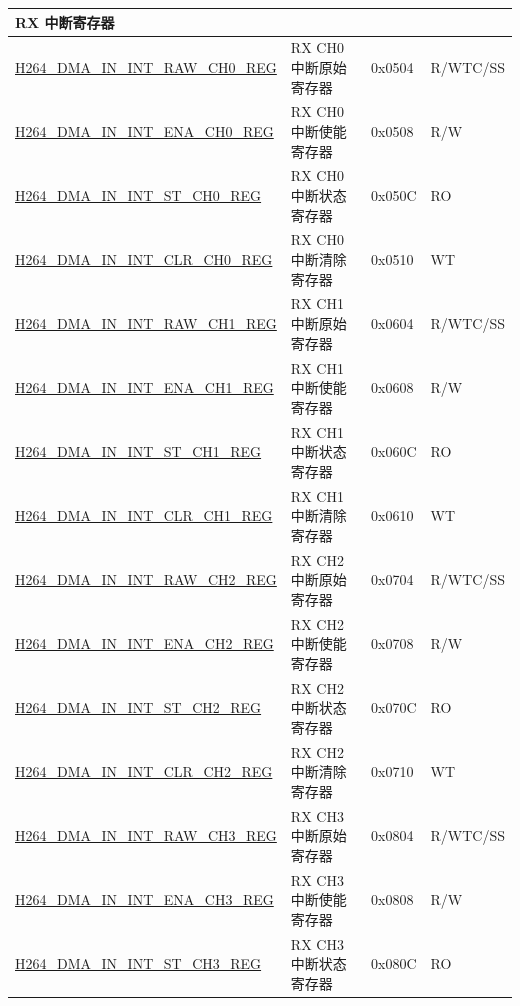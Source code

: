 \begin{longtable}{ | p{7.5cm} | p{5.7cm} | p{1.2cm} | p{1cm} | }
\multicolumn{4}{|l|}{\textbf{RX 中断寄存器}} \\ \hline
    \hyperref[regdesc:H264DMAININTRAWCH0REG]{H264\_DMA\_IN\_INT\_RAW\_CH0\_REG} & RX CH0 中断原始寄存器 & 0x0504 & R/WTC/SS \\ \hline
    \hyperref[regdesc:H264DMAININTENACH0REG]{H264\_DMA\_IN\_INT\_ENA\_CH0\_REG} & RX CH0 中断使能寄存器 & 0x0508 & R/W \\ \hline
    \hyperref[regdesc:H264DMAININTSTCH0REG]{H264\_DMA\_IN\_INT\_ST\_CH0\_REG} & RX CH0 中断状态寄存器 & 0x050C & RO \\ \hline
    \hyperref[regdesc:H264DMAININTCLRCH0REG]{H264\_DMA\_IN\_INT\_CLR\_CH0\_REG} & RX CH0 中断清除寄存器 & 0x0510 & WT \\ \hline
    \hyperref[regdesc:H264DMAININTRAWCH1REG]{H264\_DMA\_IN\_INT\_RAW\_CH1\_REG} & RX CH1 中断原始寄存器 & 0x0604 & R/WTC/SS \\ \hline
    \hyperref[regdesc:H264DMAININTENACH1REG]{H264\_DMA\_IN\_INT\_ENA\_CH1\_REG} & RX CH1 中断使能寄存器 & 0x0608 & R/W \\ \hline
    \hyperref[regdesc:H264DMAININTSTCH1REG]{H264\_DMA\_IN\_INT\_ST\_CH1\_REG} & RX CH1 中断状态寄存器 & 0x060C & RO \\ \hline
    \hyperref[regdesc:H264DMAININTCLRCH1REG]{H264\_DMA\_IN\_INT\_CLR\_CH1\_REG} & RX CH1 中断清除寄存器 & 0x0610 & WT \\ \hline
    \hyperref[regdesc:H264DMAININTRAWCH2REG]{H264\_DMA\_IN\_INT\_RAW\_CH2\_REG} & RX CH2 中断原始寄存器 & 0x0704 & R/WTC/SS \\ \hline
    \hyperref[regdesc:H264DMAININTENACH2REG]{H264\_DMA\_IN\_INT\_ENA\_CH2\_REG} & RX CH2 中断使能寄存器 & 0x0708 & R/W \\ \hline
    \hyperref[regdesc:H264DMAININTSTCH2REG]{H264\_DMA\_IN\_INT\_ST\_CH2\_REG} & RX CH2 中断状态寄存器 & 0x070C & RO \\ \hline
    \hyperref[regdesc:H264DMAININTCLRCH2REG]{H264\_DMA\_IN\_INT\_CLR\_CH2\_REG} & RX CH2 中断清除寄存器 & 0x0710 & WT \\ \hline
    \hyperref[regdesc:H264DMAININTRAWCH3REG]{H264\_DMA\_IN\_INT\_RAW\_CH3\_REG} & RX CH3 中断原始寄存器 & 0x0804 & R/WTC/SS \\ \hline
    \hyperref[regdesc:H264DMAININTENACH3REG]{H264\_DMA\_IN\_INT\_ENA\_CH3\_REG} & RX CH3 中断使能寄存器 & 0x0808 & R/W \\ \hline
    \hyperref[regdesc:H264DMAININTSTCH3REG]{H264\_DMA\_IN\_INT\_ST\_CH3\_REG} & RX CH3 中断状态寄存器 & 0x080C & RO \\ \hline

\end{longtable}
